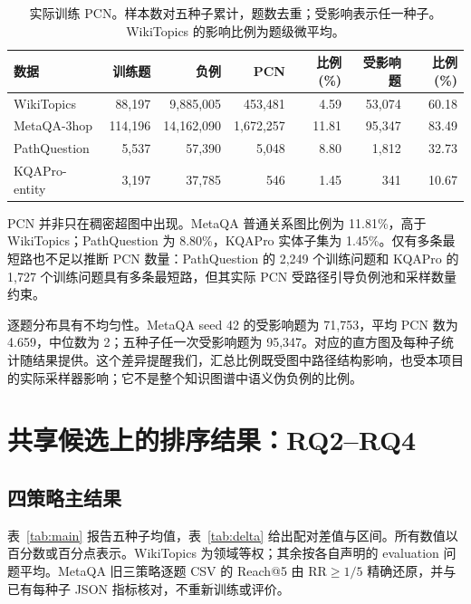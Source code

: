 \documentclass[UTF8,a4paper,10pt,fontset=fandol]{ctexart}
\begin{document}
\begin{table}[tbp]\centering
\caption{实际训练 PCN。样本数对五种子累计，题数去重；受影响表示任一种子。WikiTopics 的影响比例为题级微平均。}\label{tab:prevalence}
\small
\begin{tabular}{lrrrrrr}
\toprule
数据 & 训练题 & 负例 & PCN & 比例(\%) & 受影响题 & 比例(\%) \\
\midrule
WikiTopics & 88,197 & 9,885,005 & 453,481 & 4.59 & 53,074 & 60.18 \\
MetaQA-3hop & 114,196 & 14,162,090 & 1,672,257 & 11.81 & 95,347 & 83.49 \\
PathQuestion & 5,537 & 57,390 & 5,048 & 8.80 & 1,812 & 32.73 \\
KQAPro-entity & 3,197 & 37,785 & 546 & 1.45 & 341 & 10.67 \\
\bottomrule
\end{tabular}
\end{table}

PCN 并非只在稠密超图中出现。MetaQA 普通关系图比例为 11.81\%，高于 WikiTopics；PathQuestion 为 8.80\%，KQAPro 实体子集为 1.45\%。仅有多条最短路也不足以推断 PCN 数量：PathQuestion 的 2,249 个训练问题和 KQAPro 的 1,727 个训练问题具有多条最短路，但其实际 PCN 受路径引导负例池和采样数量约束。

逐题分布具有不均匀性。MetaQA seed 42 的受影响题为 71,753，平均 PCN 数为 4.659，中位数为 2；五种子任一次受影响题为 95,347。对应的直方图及每种子统计随结果提供。这个差异提醒我们，汇总比例既受图中路径结构影响，也受本项目的实际采样器影响；它不是整个知识图谱中语义伪负例的比例。

\section{共享候选上的排序结果：RQ2--RQ4}
\subsection{四策略主结果}
表~\ref{tab:main} 报告五种子均值，表~\ref{tab:delta} 给出配对差值与区间。所有数值以百分数或百分点表示。WikiTopics 为领域等权；其余按各自声明的 evaluation 问题平均。MetaQA 旧三策略逐题 CSV 的 Reach@5 由 $\mathrm{RR}\ge1/5$ 精确还原，并与已有每种子 JSON 指标核对，不重新训练或评价。
\end{document}
